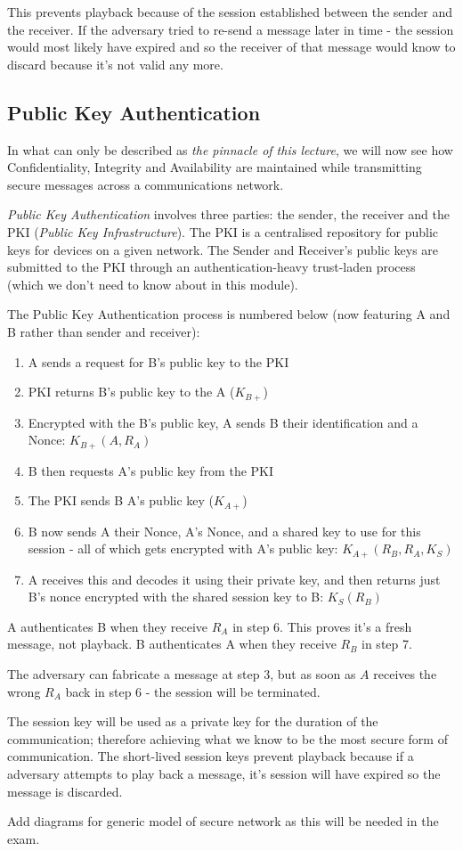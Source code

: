 This prevents playback because of the session established between the sender and the receiver. If the adversary tried to re-send a message later in time - the session would most likely have expired and so the receiver of that message would know to discard because it's not valid any more. 

\subsection{Public Key Authentication}
In what can only be described as \textit{the pinnacle of this lecture}, we will now see how Confidentiality, Integrity and Availability are maintained while transmitting secure messages across a communications network.

\textit{Public Key Authentication} involves three parties: the sender, the receiver and the PKI (\textit{Public Key Infrastructure}). The PKI is a centralised repository for public keys for devices on a given network. The Sender and Receiver's public keys are submitted to the PKI through an authentication-heavy trust-laden process (which we don't need to know about in this module). 

The Public Key Authentication process is numbered below (now featuring A and B rather than sender and receiver):
\begin{enumerate}
    \item A sends a request for B's public key to the PKI
    \item PKI returns B's public key to the A ($K_{B+}$)
    \item Encrypted with the B's public key, A sends B their identification and a Nonce: $K_{B+}(A, R_A)$
    \item B then requests A's public key from the PKI
    \item The PKI sends B A's public key ($K_{A+}$)
    \item B now sends A their Nonce, A's Nonce, and a shared key to use for this session - all of which gets encrypted with A's public key: $K_{A+}(R_B, R_A, K_S)$
    \item A receives this and decodes it using their private key, and then returns just B's nonce encrypted with the shared session key to B: $K_S(R_B)$
\end{enumerate}

A authenticates B when they receive $R_A$ in step 6. This proves it's a fresh message, not playback. B authenticates A when they receive $R_B$ in step 7. 

The adversary can fabricate a message at step 3, but as soon as $A$ receives the wrong $R_A$ back in step 6 - the session will be terminated. 

The session key will be used as a private key for the duration of the communication; therefore achieving what we know to be the most secure form of communication. The short-lived session keys prevent playback because if a adversary attempts to play back a message, it's session will have expired so the message is discarded.


\begin{todo}
Add diagrams for generic model of secure network as this will be needed in the exam.
\end{todo}